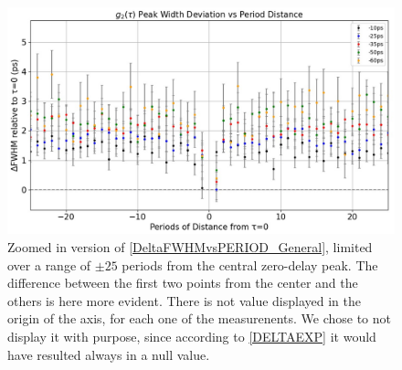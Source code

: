 \begin{figure}[hbtp]
\centering
\includegraphics[width=1\textwidth]{DeltaFWHMvsPeriods_ZOOM.jpg}
\caption{Zoomed in version of \autoref{DeltaFWHMvsPERIOD_General}, limited over a range of $\pm 25$ periods from the central zero-delay peak. The difference between the first two points from the center and the others is here more evident. There is not value displayed in the origin of the axis, for each one of the measurenents. We chose to not display it with purpose, since according to \autoref{DELTAEXP} it would have resulted always in a null value.}
\label{DeltaFWHMvsPERIOD_ZOOM}
\end{figure}
